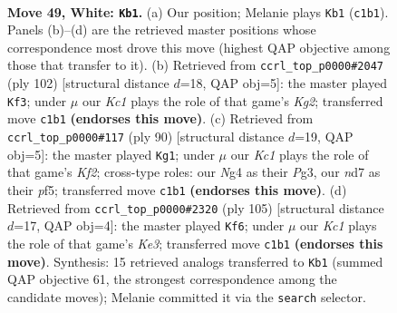 \documentclass[11pt]{article}
\begin{document}
\clearpage

\begin{figure}[p]\centering
\begin{subfigure}{0.46\textwidth}\centering
\resizebox{\linewidth}{!}{%
\newchessgame
\chessboard[
  setfen={3k4/1b1n4/8/8/p2p2N1/P5P1/1PP5/2K5 w - - 16 49},
  showmover=false,
  pgfstyle=straightmove, color=movearrow, markmove={c1-b1}
]}
\caption{}
\end{subfigure}\hfill
\begin{subfigure}{0.46\textwidth}\centering
\resizebox{\linewidth}{!}{%
\newchessgame
\chessboard[
  setfen={8/5pp1/8/7p/N1nk1P2/6P1/5PK1/8 w - - 0 52},
  showmover=false,
  pgfstyle=straightmove, color=movearrow, markmove={g2-f3}
]}
\caption{}
\end{subfigure}
\\[4pt]
\begin{subfigure}{0.46\textwidth}\centering
\resizebox{\linewidth}{!}{%
\newchessgame
\chessboard[
  setfen={8/p7/4k3/1p3p1p/1P5P/P3P1P1/5K2/8 w - - 8 46},
  showmover=false,
  pgfstyle=straightmove, color=movearrow, markmove={f2-g1}
]}
\caption{}
\end{subfigure}\hfill
\begin{subfigure}{0.46\textwidth}\centering
\resizebox{\linewidth}{!}{%
\newchessgame
\chessboard[
  setfen={8/5p2/4k3/5p2/n1NK3p/7P/6P1/8 b - - 3 53},
  showmover=false,
  pgfstyle=straightmove, color=movearrow, markmove={e6-f6}
]}
\caption{}
\end{subfigure}
\caption{\textbf{Move 49, White: \texttt{Kb1}.} (a) Our position; Melanie plays \texttt{Kb1} (\texttt{c1b1}). Panels (b)--(d) are the retrieved master positions whose correspondence most drove this move (highest QAP objective among those that transfer to it). (b) Retrieved from \texttt{ccrl\_top\_p0000\#2047} (ply 102) [structural distance $d$=18, QAP obj=5]: the master played \texttt{Kf3}; under $\mu$ our \emph{Kc1} plays the role of that game's \emph{Kg2}; transferred move \texttt{c1b1} \textbf{(endorses this move)}. (c) Retrieved from \texttt{ccrl\_top\_p0000\#117} (ply 90) [structural distance $d$=19, QAP obj=5]: the master played \texttt{Kg1}; under $\mu$ our \emph{Kc1} plays the role of that game's \emph{Kf2}; cross-type roles: our \emph{N}g4 as their \emph{P}g3, our \emph{n}d7 as their \emph{p}f5; transferred move \texttt{c1b1} \textbf{(endorses this move)}. (d) Retrieved from \texttt{ccrl\_top\_p0000\#2320} (ply 105) [structural distance $d$=17, QAP obj=4]: the master played \texttt{Kf6}; under $\mu$ our \emph{Kc1} plays the role of that game's \emph{Ke3}; transferred move \texttt{c1b1} \textbf{(endorses this move)}. Synthesis: 15 retrieved analogs transferred to \texttt{Kb1} (summed QAP objective 61, the strongest correspondence among the candidate moves); Melanie committed it via the \texttt{search} selector.}
\label{fig:thought-m96}
\end{figure}
\end{document}
